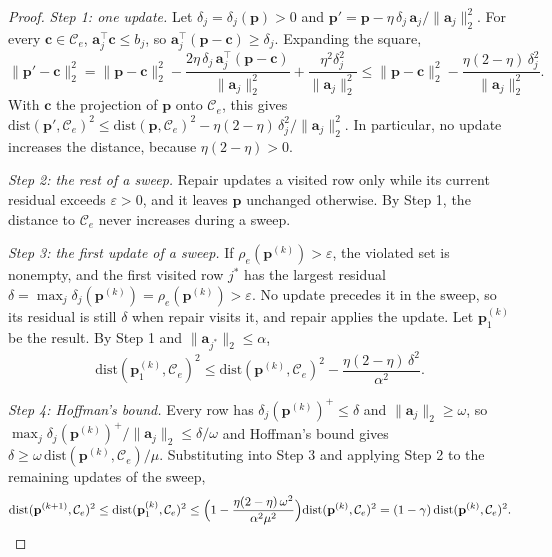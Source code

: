 \documentclass[10pt]{article}
\newcommand{\tol}{\varepsilon}
\newcommand{\pvec}{\mathbf{p}}
\newcommand{\avec}{\mathbf{a}}
\newcommand{\cvec}{\mathbf{c}}
\newcommand{\dist}{\mathrm{dist}}
\begin{document}
\begin{proof}
\emph{Step 1: one update.} Let $\delta_j = \delta_j(\pvec) > 0$ and $\pvec' = \pvec - \eta\,\delta_j\,\avec_j/\lVert\avec_j\rVert_2^2$. For every $\cvec \in \mathcal{C}_e$, $\avec_j^{\top}\cvec \le b_j$, so $\avec_j^{\top}(\pvec - \cvec) \ge \delta_j$. Expanding the square,
\begin{equation*}
\lVert\pvec' - \cvec\rVert_2^2 = \lVert\pvec - \cvec\rVert_2^2 - \frac{2\eta\,\delta_j\,\avec_j^{\top}(\pvec - \cvec)}{\lVert\avec_j\rVert_2^2} + \frac{\eta^2\delta_j^2}{\lVert\avec_j\rVert_2^2}
\le \lVert\pvec - \cvec\rVert_2^2 - \frac{\eta(2-\eta)\,\delta_j^2}{\lVert\avec_j\rVert_2^2} .
\end{equation*}
With $\cvec$ the projection of $\pvec$ onto $\mathcal{C}_e$, this gives $\dist(\pvec',\mathcal{C}_e)^2 \le \dist(\pvec,\mathcal{C}_e)^2 - \eta(2-\eta)\,\delta_j^2/\lVert\avec_j\rVert_2^2$. In particular, no update increases the distance, because $\eta(2-\eta) > 0$.

\emph{Step 2: the rest of a sweep.} Repair updates a visited row only while its current residual exceeds $\tol > 0$, and it leaves $\pvec$ unchanged otherwise. By Step 1, the distance to $\mathcal{C}_e$ never increases during a sweep.

\emph{Step 3: the first update of a sweep.} If $\rho_e(\pvec^{(k)}) > \tol$, the violated set is nonempty, and the first visited row $j^{*}$ has the largest residual $\delta = \max_j \delta_j(\pvec^{(k)}) = \rho_e(\pvec^{(k)}) > \tol$. No update precedes it in the sweep, so its residual is still $\delta$ when repair visits it, and repair applies the update. Let $\pvec^{(k)}_1$ be the result. By Step 1 and $\lVert\avec_{j^{*}}\rVert_2 \le \alpha$,
\begin{equation*}
\dist(\pvec^{(k)}_1,\mathcal{C}_e)^2 \le \dist(\pvec^{(k)},\mathcal{C}_e)^2 - \frac{\eta(2-\eta)\,\delta^2}{\alpha^2} .
\end{equation*}

\emph{Step 4: Hoffman's bound.} Every row has $\delta_j(\pvec^{(k)})^{+} \le \delta$ and $\lVert\avec_j\rVert_2 \ge \omega$, so $\max_j \delta_j(\pvec^{(k)})^{+}/\lVert\avec_j\rVert_2 \le \delta/\omega$ and Hoffman's bound gives $\delta \ge \omega\,\dist(\pvec^{(k)},\mathcal{C}_e)/\mu$. Substituting into Step 3 and applying Step 2 to the remaining updates of the sweep,
\begin{equation*}
\dist(\pvec^{(k+1)},\mathcal{C}_e)^2 \le \dist(\pvec^{(k)}_1,\mathcal{C}_e)^2 \le \Bigl(1 - \frac{\eta(2-\eta)\,\omega^2}{\alpha^2\mu^2}\Bigr)\dist(\pvec^{(k)},\mathcal{C}_e)^2 = (1-\gamma)\,\dist(\pvec^{(k)},\mathcal{C}_e)^2 .
\end{equation*}


\end{proof}
\end{document}
